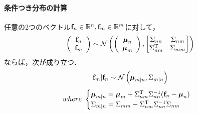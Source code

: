 \documentclass[11pt,a4j]{article}
\begin{document}
    \paragraph{条件つき分布の計算}
      任意の2つのベクトル${\bf f}_n \in \mathbb{R}^{n}, {\bf f}_m \in \mathbb{R}^{m}$に対して，
      \begin{align}
        \left(
          \begin{array}{c}
            {\bf f}_n \\ {\bf f}_m
          \end{array}
        \right)
        \sim
        \mathcal{N} 
        \left(
          \left(
            \begin{array}{c}
              {\boldsymbol \mu}_n \\ {\boldsymbol \mu}_m
            \end{array}
          \right)
          ,
          \begin{bmatrix}
            \Sigma_{nn} & \Sigma_{nm} \\
            \Sigma_{nm}^{\mathrm{T}} & \Sigma_{mm}
          \end{bmatrix}
        \right)
      \end{align}
      ならば，次が成り立つ．
      \begin{align}
        {\bf f}_m | {\bf f}_n \sim \mathcal{N}\left( {\boldsymbol \mu}_{m|n}, \Sigma_{m|n} \right) \label{form:gaussian_conditional}  
      \end{align}
      \begin{align}          
        where ~ 
        \begin{cases}
          {\boldsymbol \mu}_{m|n} = {\boldsymbol \mu}_{m} + \Sigma_{nm}^{\mathrm{T}} \Sigma_{nn}^{-1} ( {\bf f}_n - {\boldsymbol \mu}_{n} ) \\
          \Sigma_{m|n} = \Sigma_{mm} - \Sigma_{nm}^{\mathrm{T}} \Sigma_{nn}^{-1} \Sigma_{nm}
        \end{cases} \nonumber
      \end{align}
\end{document}
